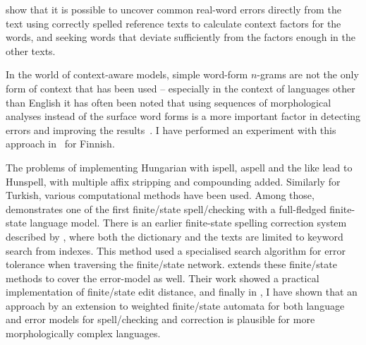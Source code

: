 \documentclass[officiallayout,final]{unihelcompling}
\begin{document}
\citet{al2006learning} show that it is possible to uncover common real-word
errors directly from the text using correctly spelled reference texts to
calculate context factors for the words, and seeking words that deviate
sufficiently from the factors enough in the other texts.

In the world of context-aware models, simple word-form \(n\)-grams are not the
only form of context that has been used -- especially in the context of
languages other than English it has often been noted that using sequences of
morphological analyses instead of the surface word forms is a more important
factor in detecting errors and improving the results~\citep[for
Spanish]{otero2007contextual}. I have performed an experiment with this
approach in~ for Finnish.

The problems of implementing Hungarian with ispell, aspell and the like lead to
Hunspell, with multiple affix stripping and compounding added. Similarly for
Turkish, various computational methods have been used. Among
those, \citet{oflazer1996errortolerant} demonstrates one of the first
finite\-/state spell\-/checking with a full-fledged finite-state language model.
There is an earlier finite-state spelling correction system described by
\citet{aho1975efficient}, where both the dictionary and the texts are limited
to keyword search from indexes.  This method used a specialised search
algorithm for error tolerance when traversing the finite\-/state network.
\citet{agata2002typographical} extends these finite\-/state methods to cover
the error-model as well. Their work showed a practical implementation of
finite\-/state edit distance, and finally in
, I have shown that an approach by an
extension to weighted finite\-/state automata for both language and error
models for spell\-/checking and correction is plausible for more
morphologically complex languages.


\end{document}

